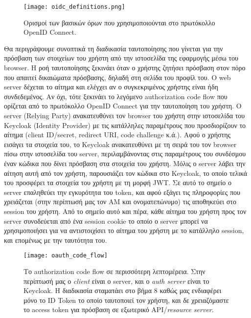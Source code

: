 \documentclass[../thesis.tex]{subfiles}
\begin{document}
\begin{figure}[!ht]
    \texttt{[image: oidc\_definitions.png]}
    \centering
    \caption{Ορισμοί των βασικών όρων που χρησιμοποιούνται στο πρωτόκολλο OpenID Connect\cite{oidc_faq}.}
\end{figure}

Θα περιγράψουμε συνοπτικά τη διαδικασία ταυτοποίησης που γίνεται για την πρόσβαση των στοιχείων του χρήστη από την ιστοσελίδα της εφαρμογής μέσω του browser.
Η ροή ταυτοποίησης ξεκινάει όταν ο χρήστης ζητήσει πρόσβαση στον πόρο που απαιτεί δικαιώματα πρόσβασης, δηλαδή στη σελίδα του προφίλ του.
Ο web server δέχεται το αίτημα και ελέγχει αν ο συγκεκριμένος χρήστης είναι ήδη συνδεδεμένος.
Αν όχι, τότε ξεκινάει το λεγόμενο authorization code flow που ορίζεται από το πρωτόκολλο OpenID Connect για την ταυτοποίηση του χρήστη.
Ο server (Relying Party) ανακατευθύνει τον browser του χρήστη στην ιστοσελίδα του Keycloak (Identity Provider) με τις κατάλληλες παραμέτρους που προσδιορίζουν το αίτημα (client ID/secret, redirect URI, code challenge κ.ά.).
Αφού ο χρήστης εισάγει τα στοιχεία του, το Keycloak ανακατευθύνει με τη σειρά του τον browser πίσω στην ιστοσελίδα του server, περιλαμβάνοντας στις παραμέτρους του συνδέσμου έναν κώδικα που δίνει πρόσβαση στα στοιχεία του χρήστη.
Μόλις ο server λάβει την αίτηση αυτή από τον χρήστη, παρουσιάζει τον κώδικα στο Keycloak, το οποίο τελικά του προσφέρει τα στοιχεία του χρήστη με τη μορφή JWT.
Σε αυτό το σημείο ο server επαληθεύει την εγκυρότητα του token, και αφού εξάγει τις πληροφορίες που χρειάζεται (στην περίπτωσή μας τον ΑΜ και ονοματεπώνυμο) τις αποθηκεύει στο session του χρήστη.
Από το σημείο αυτό και πέρα, κάθε αίτημα του χρήστη προς τον server συνοδεύεται από ένα session cookie το οποίο ο server μπορεί να χρησιμοποιήσει για να αντιστοιχίσει το αίτημα του χρήστη με το κατάλληλο session, και επομένως με την ταυτότητα του.

\begin{figure}[!ht]
    \texttt{[image: oauth\_code\_flow]}
    \centering
    \caption{Το authorization code flow σε περισσότερη λεπτομέρεια. Στην περίπτωσή μας ο \textit{client} είναι ο server, και ο \textit{auth server} είναι το Keycloak. H διαδικασία σταματάει στο βήμα 8 καθώς μας ενδιαφέρει μόνο το ID Token το οποίο ταυτοποιεί τον χρήστη, και δε χρειαζόμαστε το access token για πρόσβαση σε εξωτερικό API/\textit{resource server}\cite{okta_code_flow}.}
\end{figure}
\end{document}
